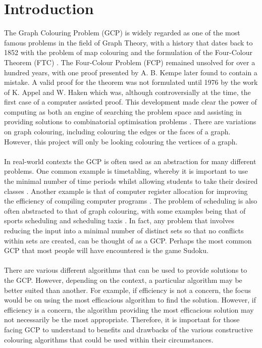 \section{Introduction}
The Graph Colouring Problem (GCP) is widely regarded as one of the most famous problems in the field of Graph Theory, with a history that dates back to 1852 with the problem of map colouring and the formulation of the Four-Colour Theorem (FTC) \cite{kubale2004}. The Four-Colour Problem (FCP) remained unsolved for over a hundred years, with one proof presented by A. B. Kempe \cite{Kempe4Color} later found to contain a mistake. A valid proof for the theorem was not formulated until 1976 by the work of K. Appel and W. Haken \cite{AppelHaken4Colour} which was, although controversially at the time, the first case of a computer assisted proof. This development made clear the power of computing as both an engine of searching the problem space and assisting in providing solutions to combinatorial optimisation problems \cite{kubale2004}. There are variations on graph colouring, including colouring the edges or the faces of a graph. However, this project will only be looking colouring the vertices of a graph. 
\\\\
In real-world contexts the GCP is often used as an abstraction for many different problems. One common example is timetabling, whereby it is important to use the minimal number of time periods whilst allowing students to take their desired classes \cite{DEWERRA1985151, Leighton1979AGC, LewisR.M.R2015AGtG, WelshPowell}. Another example is that of computer register allocation for improving the efficiency of compiling computer programs \cite{CHAITIN198147, LewisR.M.R2015AGtG}. The problem of scheduling is also often abstracted to that of graph colouring, with some examples being that of sports scheduling \cite{LEWIS2011190} and scheduling taxis \cite{LewisR.M.R2015AGtG}. In fact, any problem that involves reducing the input into a minimal number of distinct sets so that no conflicts within sets are created, can be thought of as a GCP. Perhaps the most common GCP that most people will have encountered is the game Sudoku.
\\\\
There are various different algorithms that can be used to provide solutions to the GCP. However, depending on the context, a particular algorithm may be better suited than another. For example, if efficiency is not a concern, the focus would be on using the most efficacious algorithm to find the solution. However, if efficiency is a concern, the algorithm providing the most efficacious solution may not necessarily be the most appropriate. Therefore, it is important for those facing GCP to understand to benefits and drawbacks of the various constructive colouring algorithms that could be used within their circumstances. 
